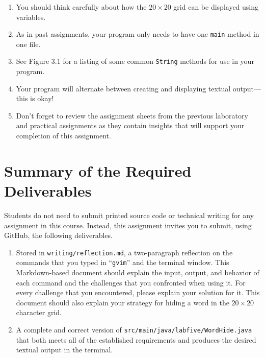 \documentclass[11pt]{article}
\newcommand{\mainprogramsource}{\lstinline{src/main/java/labfive/WordHide.java}}
\newcommand{\reflection}{\lstinline{writing/reflection.md}}
\newcommand{\command}[1]{``\lstinline{#1}''}
\newcommand{\program}[1]{\lstinline{#1}}
\begin{document}
\vspace*{-.05in}

\begin{enumerate}
  \setlength{\itemsep}{0pt}

\item You should think carefully about how the $20 \times 20$ grid can be
  displayed using variables.

\item As in past assignments, your program only needs to have one {\tt main}
  method in one file.

\item See Figure 3.1 for a listing of some common \program{String} methods for
  use in your program.

\item Your program will alternate between creating and displaying textual
  output---this is okay!

\item Don't forget to review the assignment sheets from the previous laboratory
  and practical assignments as they contain insights that will support your
  completion of this assignment.

\end{enumerate}
\vspace*{-.15in}

\section*{Summary of the Required Deliverables}

\noindent Students do not need to submit printed source code or technical writing for any assignment in this course.
Instead, this assignment invites you to submit, using GitHub, the following deliverables.

\begin{enumerate}

  \setlength{\itemsep}{0in}

\item Stored in \reflection{}, a two-paragraph reflection on the commands that you typed in \command{gvim} and the
  terminal window. This Markdown-based document should explain the input, output, and behavior of each command and the
  challenges that you confronted when using it. For every challenge that you encountered, please explain your solution
  for it. This document should also explain your strategy for hiding a word in the $20 \times 20$ character grid.

\item A complete and correct version of \mainprogramsource{} that both meets all of the established requirements and
  produces the desired textual output in the terminal.

\end{enumerate}
\end{document}
